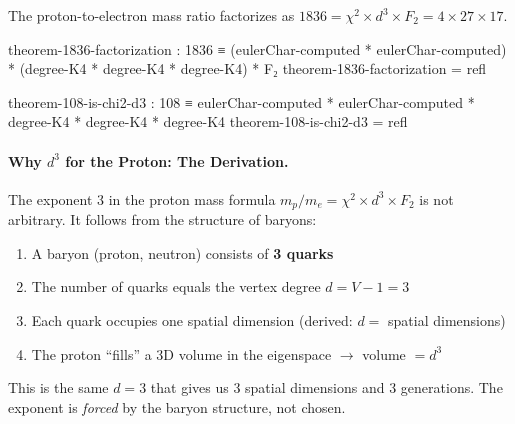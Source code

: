 \documentclass[11pt,a4paper]{book}
\begin{document}
The proton-to-electron mass ratio factorizes as $1836 = \chi^2 \times d^3 \times F_2 = 4 \times 27 \times 17$.

\begin{code}
theorem-1836-factorization : 1836 ≡ (eulerChar-computed * eulerChar-computed) * (degree-K4 * degree-K4 * degree-K4) * F₂
theorem-1836-factorization = refl

theorem-108-is-chi2-d3 : 108 ≡ eulerChar-computed * eulerChar-computed * degree-K4 * degree-K4 * degree-K4
theorem-108-is-chi2-d3 = refl
\end{code}

\paragraph{Why $d^3$ for the Proton: The Derivation.}

The exponent 3 in the proton mass formula $m_p/m_e = \chi^2 \times d^3 \times F_2$ is not 
arbitrary. It follows from the structure of baryons:

\begin{enumerate}
\item A baryon (proton, neutron) consists of \textbf{3 quarks}
\item The number of quarks equals the vertex degree $d = V - 1 = 3$
\item Each quark occupies one spatial dimension (derived: $d = $ spatial dimensions)
\item The proton ``fills'' a 3D volume in the eigenspace $\to$ volume $= d^3$
\end{enumerate}

This is the same $d = 3$ that gives us 3 spatial dimensions and 3 generations. The 
exponent is \emph{forced} by the baryon structure, not chosen.
\end{document}
